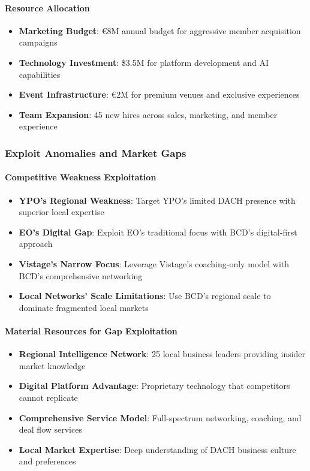 \paragraph{Resource Allocation}
\begin{itemize}
    \item \textbf{Marketing Budget}: €8M annual budget for aggressive member acquisition campaigns
    \item \textbf{Technology Investment}: \$3.5M for platform development and AI capabilities
    \item \textbf{Event Infrastructure}: €2M for premium venues and exclusive experiences
    \item \textbf{Team Expansion}: 45 new hires across sales, marketing, and member experience
\end{itemize}

\subsubsection{Exploit Anomalies and Market Gaps}

\paragraph{Competitive Weakness Exploitation}
\begin{itemize}
    \item \textbf{YPO's Regional Weakness}: Target YPO's limited DACH presence with superior local expertise
    \item \textbf{EO's Digital Gap}: Exploit EO's traditional focus with BCD's digital-first approach
    \item \textbf{Vistage's Narrow Focus}: Leverage Vistage's coaching-only model with BCD's comprehensive networking
    \item \textbf{Local Networks' Scale Limitations}: Use BCD's regional scale to dominate fragmented local markets
\end{itemize}

\paragraph{Material Resources for Gap Exploitation}
\begin{itemize}
    \item \textbf{Regional Intelligence Network}: 25 local business leaders providing insider market knowledge
    \item \textbf{Digital Platform Advantage}: Proprietary technology that competitors cannot replicate
    \item \textbf{Comprehensive Service Model}: Full-spectrum networking, coaching, and deal flow services
    \item \textbf{Local Market Expertise}: Deep understanding of DACH business culture and preferences
\end{itemize}

